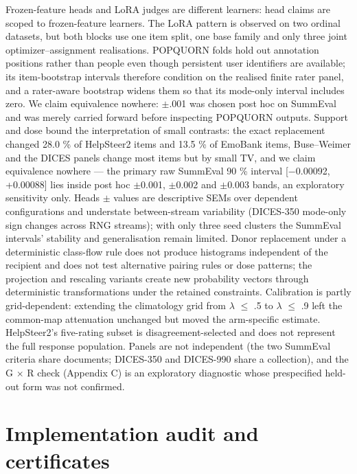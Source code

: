 \documentclass[10pt]{article}
\begin{document}
Frozen-feature heads and LoRA judges are different learners: head claims are scoped to frozen-feature learners. The LoRA pattern is observed on two ordinal datasets, but both blocks use one item split, one base family and only three joint optimizer--assignment realisations. POPQUORN folds hold out annotation positions rather than people even though persistent user identifiers are available; its item-bootstrap intervals therefore condition on the realised finite rater panel, and a rater-aware bootstrap widens them so that its mode-only interval includes zero. We claim equivalence nowhere: $\pm$.001 was chosen post hoc on SummEval and was merely carried forward before inspecting POPQUORN outputs. Support and dose bound the interpretation of small contrasts: the exact replacement changed 28.0 \% of HelpSteer2 items and 13.5 \% of EmoBank items, Buse--Weimer and the DICES panels change most items but by small TV, and we claim equivalence nowhere --- the primary raw SummEval 90 \% interval {[}$-$0.00092, +0.00088{]} lies inside post hoc $\pm$0.001, $\pm$0.002 and $\pm$0.003 bands, an exploratory sensitivity only. Heads $\pm$ values are descriptive SEMs over dependent configurations and understate between-stream variability (DICES-350 mode-only sign changes across RNG streams); with only three seed clusters the SummEval intervals' stability and generalisation remain limited. Donor replacement under a deterministic class-flow rule does not produce histograms independent of the recipient and does not test alternative pairing rules or dose patterns; the projection and rescaling variants create new probability vectors through deterministic transformations under the retained constraints. Calibration is partly grid-dependent: extending the climatology grid from $\lambda$ $\leq$ .5 to $\lambda$ $\leq$ .9 left the common-map attenuation unchanged but moved the arm-specific estimate. HelpSteer2's five-rating subset is disagreement-selected and does not represent the full response population. Panels are not independent (the two SummEval criteria share documents; DICES-350 and DICES-990 share a collection), and the G $\times$ R check (Appendix C) is an exploratory diagnostic whose prespecified held-out form was not confirmed.

\appendix
\section{Implementation audit and certificates}
\end{document}
